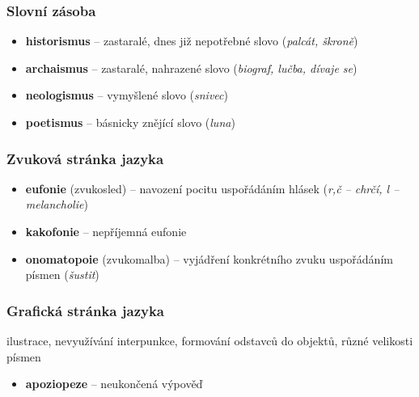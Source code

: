 \documentclass[10pt,a4paper]{article}
\begin{document}
\subsubsection{Slovní zásoba}
\begin{itemize}
\item[] \textbf{historismus} -- zastaralé, dnes již nepotřebné slovo (\textit{palcát, škroně})
\item[] \textbf{archaismus} -- zastaralé, nahrazené slovo (\textit{biograf, lučba, dívaje se})
\item[] \textbf{neologismus} -- vymyšlené slovo (\textit{snivec})
\item[] \textbf{poetismus} -- básnicky znějící slovo (\textit{luna})
\end{itemize}

\subsubsection{Zvuková stránka jazyka}
\begin{itemize}
\item[] \textbf{eufonie} (zvukosled) -- navození pocitu uspořádáním hlásek (\textit{r,č – chrčí, l – melancholie})
\item[] \textbf{kakofonie} -- nepříjemná eufonie
\item[] \textbf{onomatopoie} (zvukomalba) -- vyjádření konkrétního zvuku uspořádáním písmen (\textit{šustit})
\end{itemize}

\subsubsection{Grafická stránka jazyka}
ilustrace, nevyužívání interpunkce, formování odstavců do objektů, různé velikosti písmen
\begin{itemize}
\item[] \textbf{apoziopeze} -- neukončená výpověď
\end{itemize}
\end{document}
